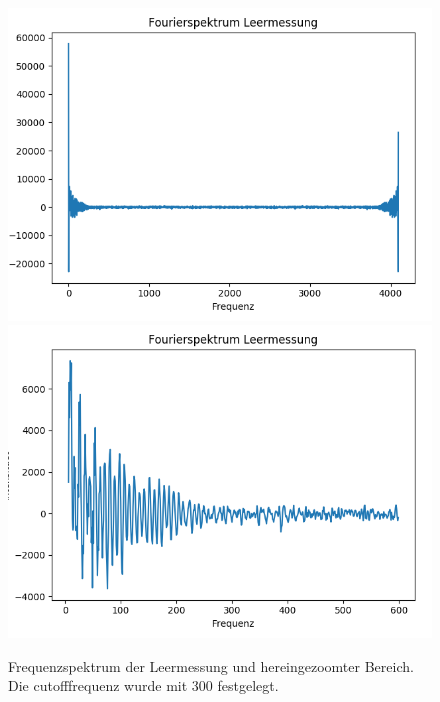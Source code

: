 \documentclass[12pt,a4paper]{article}
\begin{document}
\begin{figure}
\centering
\includegraphics[scale=0.8]{Bilder/alpha_spektren/leer_fourier.png}
\includegraphics[scale=0.8]{Bilder/alpha_spektren/leer_fourier_2.png}
\caption{Frequenzspektrum der Leermessung und hereingezoomter Bereich. Die cutofffrequenz wurde mit 300 festgelegt.}
\label{fig:a_prob_four}
\end{figure}
\end{document}
